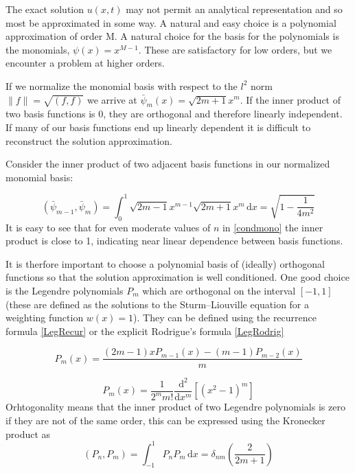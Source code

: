 \documentclass[letterpaper]{article}
\begin{document}
The exact solution $u(x,t)$ may not permit an analytical representation and so most be approximated in some way. A natural and easy choice is a polynomial approximation of order M. A natural choice for the basis for the polynomials is the monomials, $\psi(x) = x^{M-1}$. These are satisfactory for low orders, but we encounter a problem at higher orders.

If we normalize the monomial basis with respect to the $l^2$ norm $\|f\|=\sqrt{(f,f)}$ we arrive at $\bar{\psi}_m(x) = \sqrt{2m+1}x^m$. If the inner product of two basis functions is 0, they are orthogonal and therefore linearly independent. If many of our basis functions end up linearly dependent it is difficult to reconstruct the solution approximation.

Consider the inner product of two adjacent basis functions in our normalized monomial basis:

\begin{equation}\label{condmono}
(\bar{\psi}_{m-1},\bar{\psi}_m) = \int_0^1 \! \sqrt{2m-1}x^{m-1}\sqrt{2m+1}x^{m} \, \mathrm{d}x = \sqrt{1-\frac{1}{4m^2}}
\end{equation}
It is easy to see that for even moderate values of $n$ in \eqref{condmono} the inner product is close to 1, indicating near linear dependence between basis functions.

It is therfore important to choose a polynomial basis of (ideally) orthogonal functions so that the solution approximation is well conditioned. One good choice is the Legendre polynomials $P_m$ which are orthogonal on the interval $[-1,1]$ (these are defined as the solutions to the Sturm–Liouville equation for a weighting function $w(x)=1$). They can be defined using the recurrence formula \eqref{LegRecur} or the explicit Rodrigue's formula \eqref{LegRodrig}

\begin{equation}\label{LegRecur}
P_m(x) = \frac{(2m-1)xP_{m-1}(x) - (m-1)P_{m-2}(x)}{m}
\end{equation}

\begin{equation}\label{LegRodrig}
P_m(x) = \frac{1}{2^m m!}\frac{\mathrm{d}^2}{\mathrm{d}x^m}\left[(x^2-1)^m\right]
\end{equation}
Orhtogonality means that the inner product of two Legendre polynomials is zero if they are not of the same order, this can be expressed using the Kronecker product as
\begin{equation}\label{LegInnerProd}
(P_n,P_m) = \int_{-1}^1 \! P_n P_m \, \mathrm{d}x = \delta_{nm} \left(\frac{2}{2m+1}\right)
\end{equation}
\end{document}
